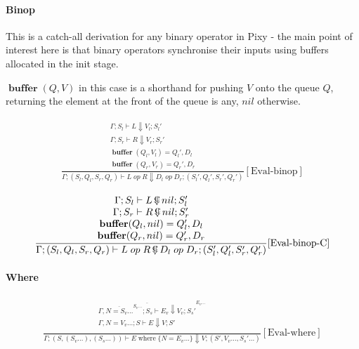 \documentclass{scrartcl}
\DeclareMathOperator{\where}{where}
\DeclareMathOperator{\ceval}{\overset{C}{\smash{\Downarrow}}}
\DeclareMathOperator{\buffer}{\mathbf{buffer}}
\begin{document}
    \paragraph{Binop}
    
    This is a catch-all derivation for any binary operator in Pixy - the main point of interest here is that binary operators synchronise their inputs using buffers allocated in the init stage.
    
    $\buffer(Q, V)$ in this case is a shorthand for pushing $V$ onto the queue $Q$, returning the element at the front of the queue is any, $nil$ otherwise.
    
    \begin{align*}
    \frac{
        \begin{matrix}
        \Gamma; S_l \vdash L \Downarrow V_l; S_l' \\
        \Gamma; S_r \vdash R \Downarrow V_r; S_r' \\
        \buffer(Q_l, V_l) = Q_l', D_l \\
        \buffer(Q_r, V_r) = Q_r', D_r
        \end{matrix}
    }{
        \Gamma; (S_l, Q_l, S_r, Q_r) \vdash L \; op \; R \Downarrow D_l \; op \; D_r; (S_l', Q_l', S_r', Q_r')
    }[\text{Eval-binop}]
    \end{align*}
    
    \begin{align*}
    \frac{
        \begin{matrix}
        \Gamma; S_l \vdash L \ceval nil; S_l' \\
        \Gamma; S_r \vdash R \ceval nil; S_r' \\
        \buffer(Q_l, nil) = Q_l', D_l \\
        \buffer(Q_r, nil) = Q_r', D_r
        \end{matrix}
    }{
        \Gamma; (S_l, Q_l, S_r, Q_r) \vdash L \; op \; R \ceval D_l \; op \; D_r; (S_l', Q_l', S_r', Q_r')
    }[\text{Eval-binop-C}]
    \end{align*}
    
    \paragraph{Where}
    
    \begin{align*}
    \frac{
        \begin{matrix}
        \overline{\Gamma, \overline{N=S_v...}^{S_v...}; S_s \vdash E_v \Downarrow V_v; S_s'}^{E_v...} \\
        \Gamma, N=V_v...; S \vdash E \Downarrow V; S' \\
        \end{matrix}
    }{
        \Gamma; (S, (S_v...), (S_s...)) \vdash E \where \{ N=E_v... \} \Downarrow V; (S', V_v..., S_s'...)
    }[\text{Eval-where}]
    \end{align*}
    
\end{document}

